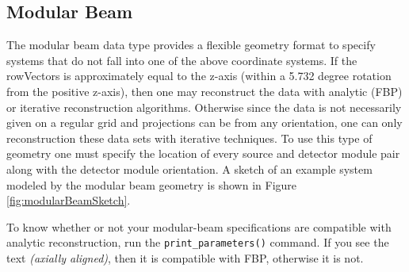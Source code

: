 \documentclass[11pt]{article}
\begin{document}

\subsection{Modular Beam}

The modular beam data type provides a flexible geometry format to specify systems that do not fall into one of the above coordinate systems.  If the rowVectors is approximately equal to the z-axis (within a 5.732 degree rotation from the positive z-axis), then one may reconstruct the data with analytic (FBP) or iterative reconstruction algorithms.  Otherwise since the data is not necessarily given on a regular grid and projections can be from any orientation, one can only reconstruction these data sets with iterative techniques.  To use this type of geometry one must specify the location of every source and detector module pair along with the detector module orientation.  A sketch of an example system modeled by the modular beam geometry is shown in Figure \ref{fig:modularBeamSketch}.

To know whether or not your modular-beam specifications are compatible with analytic reconstruction, run the \texttt{print\_parameters()} command.  If you see the text \textit{(axially aligned)}, then it is compatible with FBP, otherwise it is not.
\end{document}
